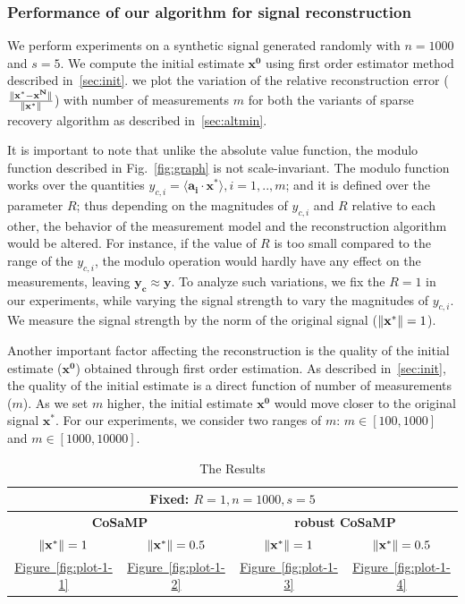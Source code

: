 \subsubsection{Performance of our algorithm for signal reconstruction}
We perform experiments on a synthetic signal generated randomly with $n=1000$ and $s=5$. We compute the initial estimate $\mathbf{x^0}$ using first order estimator method described in~\ref{sec:init}. we plot the variation of the relative reconstruction error ($\frac{\|\mathbf{x^*-x^N}\|}{\|\mathbf{x^*}\|}$) with number of measurements $m$ for both the variants of sparse recovery algorithm as described in~\ref{sec:altmin}.

It is important to note that unlike the absolute value function, the modulo function described in Fig.~\ref{fig:graph} is not scale-invariant. The modulo function works over the quantities $y_{c,i}=\langle \mathbf{a_i} \cdot \mathbf{x^*} \rangle, i=1,..,m$; and it is defined over the parameter $R$; thus depending on the magnitudes of $y_{c,i}$ and $R$ relative to each other, the behavior of the measurement model and the reconstruction algorithm would be altered. For instance, if the value of $R$ is too small compared to the range of the $y_{c,i}$, the modulo operation would hardly have any effect on the measurements, leaving $\mathbf{y_c \approx y}$. To analyze such variations, we fix the $R =1$ in our experiments, while varying the signal strength to vary the magnitudes of $y_{c,i}$. We measure the signal strength by the norm of the original signal ($\|\mathbf{{x}^*}\|=1$).

Another important factor affecting the reconstruction is the quality of the initial estimate ($\mathbf{{x}^0}$) obtained through first order estimation. As described in~\ref{sec:init}, the quality of the initial estimate is a direct function of number of measurements ($m$). As we set $m$ higher, the initial estimate $\mathbf{{x}^0}$ would move closer to the original signal $\mathbf{{x}^*}$. For our experiments, we consider two ranges of $m$: $m \in [100,1000]$ and $m \in [1000,10000]$.
\begin{center}
	\begin{table}
		\centering
		\begin{tabular}{cccc}\toprule
			\multicolumn{4}{c}{\small{\textbf{Fixed:} $R=1, n=1000, s=5$}} \\ \midrule
			\multicolumn{2}{c}{\textbf{CoSaMP}}&\multicolumn{2}{c}{\textbf{robust CoSaMP}}
			\\\cmidrule(r){1-2}\cmidrule(r){3-4}  
			\small{$\|\mathbf{{x}^*}\|=1$}&\small{$\|\mathbf{{x}^*}\|=0.5$}&\small{$\|\mathbf{{x}^*}\|=1$}&\small{$\|\mathbf{{x}^*}\|=0.5$}\\\midrule
			\hyperref[fig:plot-1-1]{Figure~\ref{fig:plot-1-1}} & \hyperref[fig:plot-1-2]{Figure~\ref{fig:plot-1-2}}
			& \hyperref[fig:plot-1-3]{Figure~\ref{fig:plot-1-3}}  & \hyperref[fig:plot-1-4]{Figure~\ref{fig:plot-1-4}} \\
			\bottomrule
		\end{tabular}
		\caption{The Results}\label{Tab2}
	\end{table} 	
\end{center}


